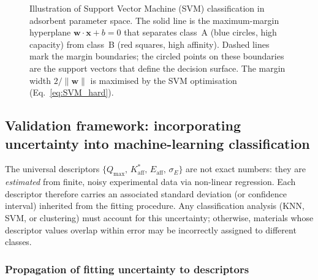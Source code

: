 \documentclass[12pt]{article}
\begin{document}
\begin{figure}[H]
		\caption{Illustration of Support Vector Machine (SVM)
			classification in adsorbent parameter space.
			The solid line is the maximum-margin hyperplane
			$\mathbf{w}\cdot\mathbf{x}+b=0$ that separates
			class~A (blue circles, high capacity) from class~B
			(red squares, high affinity).  Dashed lines mark the
			margin boundaries; the circled points on these
			boundaries are the support vectors that define the
			decision surface.  The margin width
			$2/\|\mathbf{w}\|$ is maximised by the SVM
			optimisation (Eq.~\ref{eq:SVM_hard}).}
		\label{fig:SVM_illustration}
	\end{figure}

	\subsection{Validation framework: incorporating uncertainty into
		machine-learning classification}

	The universal descriptors
	$\{Q_{\max},\, K_{\mathrm{aff}}^{\ast},\, E_{\mathrm{aff}},\,
	\sigma_E\}$ are not exact numbers: they are \emph{estimated}
	from finite, noisy experimental data via non-linear regression.
	Each descriptor therefore carries an associated standard
	deviation (or confidence interval) inherited from the fitting
	procedure.  Any classification analysis (KNN, SVM, or
	clustering) must account for this uncertainty; otherwise,
	materials whose descriptor values overlap within error may be
	incorrectly assigned to different classes.

	\subsubsection{Propagation of fitting uncertainty to descriptors}
\end{document}
